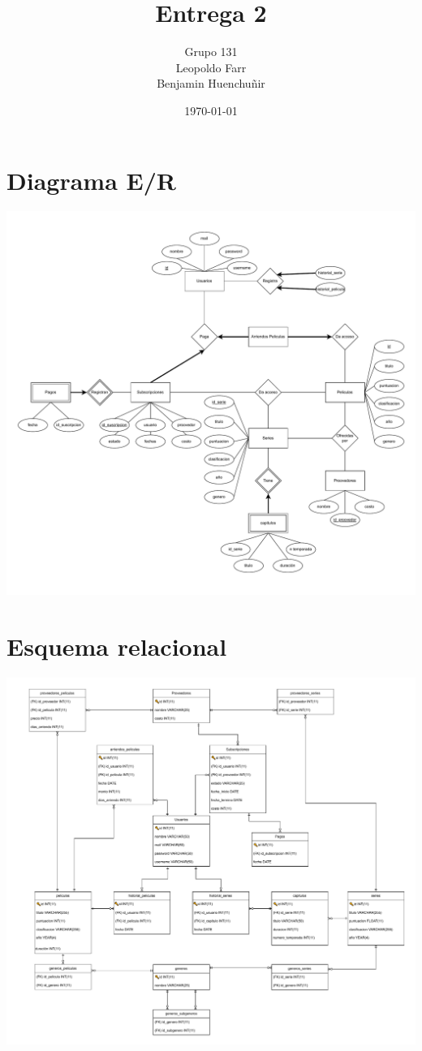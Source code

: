 \documentclass{article}
\title{Entrega 2}
\author{Grupo 131 \\ Leopoldo Farr \\ Benjamin Huenchuñir}
\date{\today}
\begin{document}
\maketitle

\section{Diagrama E/R}

\includegraphics[width=16cm]{Esquemas/diagrama_ER.pdf}

\section{Esquema relacional}

\includegraphics[width=16cm]{Esquemas/EsquemaRelacionalFinal.pdf}
\end{document}
